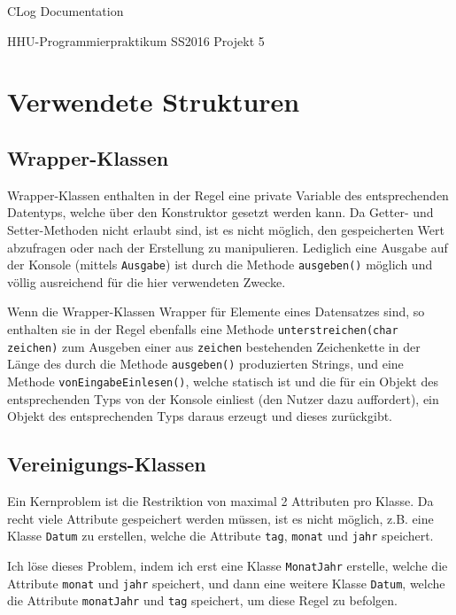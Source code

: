 \documentclass[oneside,12pt]{scrartcl}
\newcommand{\code}[1]{\textcolor{Firebrick4}{\bcode{#1}}}
\newcommand{\class}[1]{\textcolor{Green4}{\bcode{#1}}}
\newcommand{\method}[1]{\textcolor{Orange3}{\bcode{#1()}}}
\newcommand{\function}[2]{\textcolor{Orange3}{\bcode{#1(\attribute{#2})}}}
\newcommand{\attribute}[1]{\textcolor{SkyBlue3}{\bcode{#1}}}
\newcommand{\bcode}[1]{\texttt{#1}}
\begin{document}
\setlength{\parindent}{0pt} %
\setlength{\parskip}{5pt}
\cofoot{}
\rofoot{\pagemark}

\begin{center}
\Huge{CLog Documentation} \par
\Large{HHU-Programmierpraktikum SS2016 Projekt 5}
\end{center}

\tableofcontents

\section{Verwendete Strukturen}
\subsection{Wrapper-Klassen}
Wrapper-Klassen enthalten in der Regel eine private Variable des entsprechenden Datentyps, welche über den Konstruktor gesetzt werden kann. Da Getter- und Setter-Methoden nicht erlaubt sind, ist es nicht möglich, den gespeicherten Wert abzufragen oder nach der Erstellung zu manipulieren. Lediglich eine Ausgabe auf der Konsole (mittels \class{Ausgabe}) ist durch die Methode \method{ausgeben} möglich und völlig ausreichend für die hier verwendeten Zwecke.

Wenn die Wrapper-Klassen Wrapper für Elemente eines Datensatzes sind, so enthalten sie in der Regel ebenfalls eine Methode \function{unterstreichen}{char zeichen} zum Ausgeben einer aus \attribute{zeichen} bestehenden Zeichenkette in der Länge des durch die Methode \method{ausgeben} produzierten Strings, und eine Methode \method{vonEingabeEinlesen}, welche statisch ist und die für ein Objekt des entsprechenden Typs von der Konsole einliest (den Nutzer dazu auffordert), ein Objekt des entsprechenden Typs daraus erzeugt und dieses zurückgibt.

\subsection{\glqq Vereinigungs\grqq-Klassen}
Ein Kernproblem ist die Restriktion von maximal 2 Attributen pro Klasse. Da recht viele Attribute gespeichert werden müssen, ist es nicht möglich, z.B. eine Klasse \class{Datum} zu erstellen, welche die Attribute \code{tag}, \code{monat} und \code{jahr} speichert.

Ich löse dieses Problem, indem ich erst eine Klasse \class{MonatJahr} erstelle, welche die Attribute \code{monat} und \code{jahr} speichert, und dann eine weitere Klasse \class{Datum}, welche die Attribute \code{monatJahr} und \code{tag} speichert, um diese Regel zu befolgen. 
\end{document}
